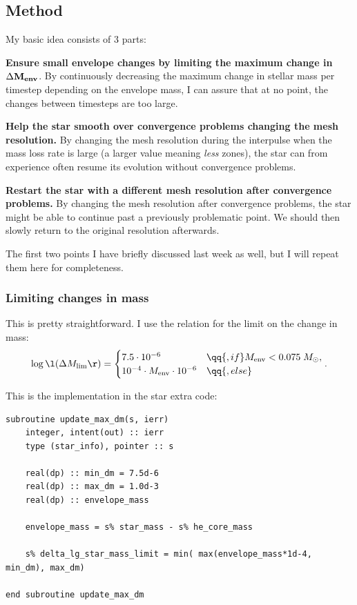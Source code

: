 \documentclass[a4paper,10pt]{article}
\begin{document}
\subsection{Method}
\begin{full}

My basic idea consists of 3 parts:
\begin{enumd}
    \item \textbf{Ensure small envelope changes by limiting the maximum change in} \(\Delta \mathbf{M_\text{\textbf{env}}}\). By continuously decreasing the maximum change in stellar mass per timestep depending on the envelope mass, I can assure that at no point, the changes between timesteps are too large.
    \item  \textbf{Help the star smooth over convergence problems changing the mesh resolution.} By changing the mesh resolution during the interpulse when the mass loss rate is large (a larger value meaning \emph{less} zones), the star can from experience often resume its evolution without convergence problems.
    \item  \textbf{Restart the star with a different mesh resolution after convergence problems.} By changing the mesh resolution after convergence problems, the star might be able to continue past a previously problematic point. We should then slowly return to the original resolution afterwards.
\end{enumd}

The first two points I have briefly discussed last week as well, but I will repeat them here for completeness.
\subsubsection{Limiting changes in mass}
This is pretty straightforward. I use the relation for the limit on the change in mass:
\begin{equation*}
    \log \l(\Delta M_\text{lim}\r) = 
                            \begin{cases}
                                7.5\cdot 10^{-6} &\qq{, if } M_\text{env} < 0.075\;M_\odot,\\
                                10^{-4}\cdot M_\text{env}\cdot 10^{-6} &\qq{, else}
                            \end{cases}.
\end{equation*}

This is the implementation in the star extra code:
\begin{verbatim}
subroutine update_max_dm(s, ierr)
    integer, intent(out) :: ierr
    type (star_info), pointer :: s

    real(dp) :: min_dm = 7.5d-6
    real(dp) :: max_dm = 1.0d-3
    real(dp) :: envelope_mass

    envelope_mass = s% star_mass - s% he_core_mass

    s% delta_lg_star_mass_limit = min( max(envelope_mass*1d-4, min_dm), max_dm)

end subroutine update_max_dm
\end{verbatim}
\end{full}
\end{document}
